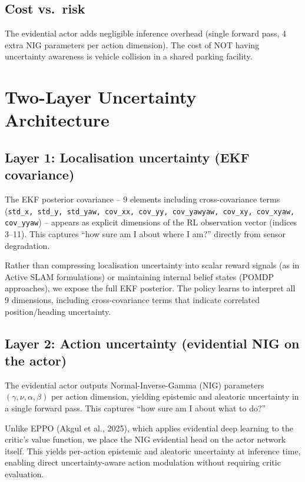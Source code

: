 \documentclass[11pt,a4paper]{article}
\begin{document}
\subsection{Cost vs.\ risk}

The evidential actor adds negligible inference overhead (single forward pass,
4 extra NIG parameters per action dimension). The cost of NOT having
uncertainty awareness is vehicle collision in a shared parking facility.

\section{Two-Layer Uncertainty Architecture}

\subsection{Layer 1: Localisation uncertainty (EKF covariance)}

The EKF posterior covariance -- 9 elements including cross-covariance terms
(\texttt{std\_x, std\_y, std\_yaw, cov\_xx, cov\_yy, cov\_yawyaw, cov\_xy,
cov\_xyaw, cov\_yyaw}) -- appears as explicit dimensions of the RL
observation vector (indices 3--11). This captures ``how sure am I about
where I am?'' directly from sensor degradation.

Rather than compressing localisation uncertainty into scalar reward signals
(as in Active SLAM formulations) or maintaining internal belief states
(POMDP approaches), we expose the full EKF posterior. The policy learns
to interpret all 9 dimensions, including cross-covariance terms that
indicate correlated position/heading uncertainty.

\subsection{Layer 2: Action uncertainty (evidential NIG on the actor)}

The evidential actor outputs Normal-Inverse-Gamma (NIG) parameters
$(\gamma, \nu, \alpha, \beta)$ per action dimension, yielding epistemic
and aleatoric uncertainty in a single forward pass. This captures
``how sure am I about what to do?''

Unlike EPPO (Akgul et al., 2025), which applies evidential deep learning
to the critic's value function, we place the NIG evidential head on the
actor network itself. This yields per-action epistemic and aleatoric
uncertainty at inference time, enabling direct uncertainty-aware action
modulation without requiring critic evaluation.
\end{document}
